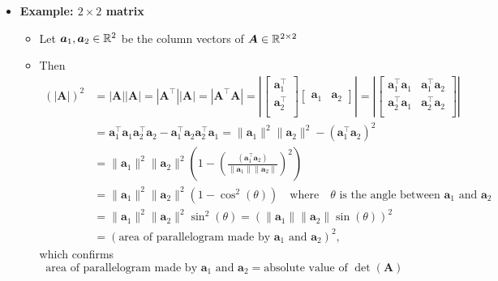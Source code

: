 \documentclass[12pt,a4paper]{article}
\begin{document}
\begin{itemize}
\item \textbf{Example: $2\times 2$ matrix}
  \begin{itemize}
  \item Let $\bm{a}_{1}, \bm{a}_{2}\in \mathbb{R}^{2}$ be the column vectors of $\bm{A}\in \mathbb{R}^{2\times 2}$
  \item Then
    \begin{align}
      (|\bm{A}|)^{2}
        & = |\bm{A}||\bm{A}|
        = |\bm{A}^{\top}||\bm{A}|
        = |\bm{A}^{\top}\bm{A}|
        = \left|
          \begin{bmatrix}
            \bm{a}_{1}^{\top} \\
            \bm{a}_{2}^{\top} \\
          \end{bmatrix}
          \begin{bmatrix}
            \bm{a}_{1} & \bm{a}_{2}
          \end{bmatrix}
          \right|
        = \left|
          \begin{bmatrix}
            \bm{a}_{1}^{\top}\bm{a}_{1} & \bm{a}_{1}^{\top}\bm{a}_{2} \\
            \bm{a}_{2}^{\top}\bm{a}_{1} & \bm{a}_{2}^{\top}\bm{a}_{2} \\
          \end{bmatrix}
          \right|  \nonumber \\
        & = \bm{a}_{1}^{\top}\bm{a}_{1}\bm{a}_{2}^{\top}\bm{a}_{2}
          - \bm{a}_{1}^{\top}\bm{a}_{2}\bm{a}_{2}^{\top}\bm{a}_{1}
         = \|\bm{a}_{1}\|^{2}\|\bm{a}_{2}\|^{2} - (\bm{a}_{1}^{\top}\bm{a}_{2})^{2} \nonumber \\
        & = \|\bm{a}_{1}\|^{2}\|\bm{a}_{2}\|^{2} \left(1 - \left(\frac{(\bm{a}_{1}^{\top}\bm{a}_{2})}{\|\bm{a}_{1}\|\|\bm{a}_{2}\|}\right)^{2}\right)  \nonumber \\
        & = \|\bm{a}_{1}\|^{2}\|\bm{a}_{2}\|^{2} \left(1 - \cos^{2}(\theta)\right) \quad\text{where}\quad \text{$\theta$ is the angle between $\bm{a}_{1}$ and $\bm{a}_{2}$}  \nonumber \\
        & = \|\bm{a}_{1}\|^{2}\|\bm{a}_{2}\|^{2}\sin^{2}(\theta)
        = \left(\|\bm{a}_{1}\|\|\bm{a}_{2}\|\sin(\theta)\right)^{2}  \nonumber \\
        & = \left(\text{area of parallelogram made by $\bm{a}_{1}$ and $\bm{a}_{2}$}\right)^{2},
    \nonumber%
    \end{align}
    which confirms
    \begin{equation}\nonumber%
      \text{area of parallelogram made by $\bm{a}_{1}$ and $\bm{a}_{2}$}
      = \text{absolute value of $\det(\bm{A})$}
    \end{equation}
  \end{itemize}

\end{itemize}
\end{document}
